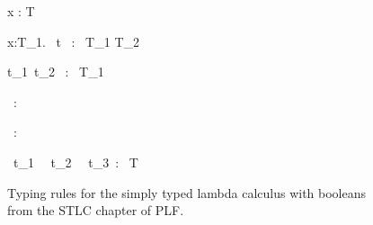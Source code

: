 \documentclass[12pt]{article}
\begin{document}
\pagebreak

\begin{figure}

    {\Gamma \vdash x : T }
\vspace{1cm}

  {\Gamma \vdash \lambda\;x:T_1.~ t ~:~ T_1 \rightarrow T_2 }
  \vspace{1cm}

  {\Gamma \vdash t_1~t_2 ~:~ T_1 }
  \vspace{1cm}

  \infrule[T-True]
  {}
  { \Gamma \vdash {} ~:~ }
  \vspace{1cm}

  \infrule[T-False]
  {}
  { \Gamma \vdash {} ~:~ }
  \vspace{1cm}

  { \Gamma \vdash {} ~t_1~ 
    ~t_2~  ~t_3~:~ T}


    \caption{Typing rules for the simply typed lambda calculus with
      booleans from the STLC chapter of PLF.}
    \label{fig:typing+STLC}
  \end{figure}
\end{document}

